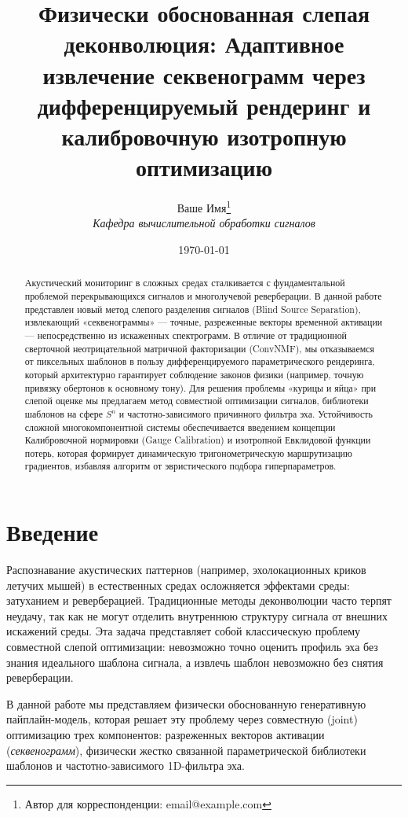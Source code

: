 \documentclass[11pt,a4paper]{article}
\title{\textbf{Физически обоснованная слепая деконволюция: Адаптивное извлечение секвенограмм через дифференцируемый рендеринг и калибровочную изотропную оптимизацию}}
\author{Ваше Имя\thanks{Автор для корреспонденции: email@example.com} \\ 
        \small \textit{Кафедра вычислительной обработки сигналов}}
\date{\today}
\begin{document}
\maketitle

\begin{abstract}
Акустический мониторинг в сложных средах сталкивается с фундаментальной проблемой перекрывающихся сигналов и многолучевой реверберации. В данной работе представлен новый метод слепого разделения сигналов (Blind Source Separation), извлекающий «секвенограммы» — точные, разреженные векторы временной активации — непосредственно из искаженных спектрограмм. В отличие от традиционной сверточной неотрицательной матричной факторизации (ConvNMF), мы отказываемся от пиксельных шаблонов в пользу дифференцируемого параметрического рендеринга, который архитектурно гарантирует соблюдение законов физики (например, точную привязку обертонов к основному тону). Для решения проблемы «курицы и яйца» при слепой оценке мы предлагаем метод совместной оптимизации сигналов, библиотеки шаблонов на сфере $S^n$ и частотно-зависимого причинного фильтра эха. Устойчивость сложной многокомпонентной системы обеспечивается введением концепции Калибровочной нормировки (Gauge Calibration) и изотропной Евклидовой функции потерь, которая формирует динамическую тригонометрическую маршрутизацию градиентов, избавляя алгоритм от эвристического подбора гиперпараметров.
\end{abstract}

\section{Введение}
Распознавание акустических паттернов (например, эхолокационных криков летучих мышей) в естественных средах осложняется эффектами среды: затуханием и реверберацией. Традиционные методы деконволюции часто терпят неудачу, так как не могут отделить внутреннюю структуру сигнала от внешних искажений среды. Эта задача представляет собой классическую проблему совместной слепой оптимизации: невозможно точно оценить профиль эха без знания идеального шаблона сигнала, а извлечь шаблон невозможно без снятия реверберации.

В данной работе мы представляем физически обоснованную генеративную пайплайн-модель, которая решает эту проблему через совместную (joint) оптимизацию трех компонентов: разреженных векторов активации (\textit{секвенограмм}), физически жестко связанной параметрической библиотеки шаблонов и частотно-зависимого 1D-фильтра эха.
\end{document}
